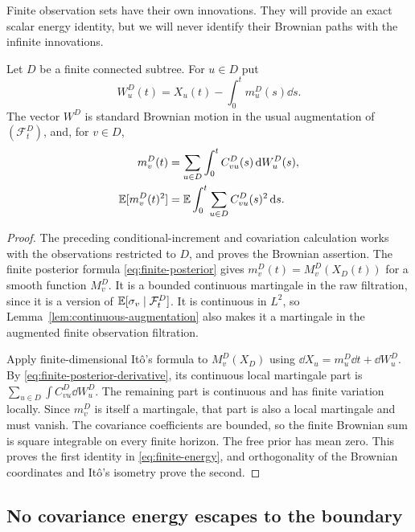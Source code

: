 Finite observation sets have their own innovations.  They will provide
an exact scalar energy identity, but we will never identify their
Brownian paths with the infinite innovations.

\begin{lemma}
 \label{lem:finite-energy}
Let $D$ be a finite connected subtree.  For $u\in D$ put
\[
 W_u^D(t)=X_u(t)-\int_0^t m_u^D(s)\dd s.
\]
The vector $W^D$ is standard Brownian motion in the usual augmentation
of $(\mathcal F_t^D)$, and, for $v\in D$,
\begin{equation}
 \label{eq:finite-energy}
 \begin{split}
 m_v^D(t)&=\sum_{u\in D}\int_0^t C_{vu}^D(s)\,\mathrm d W_u^D(s),\\
 \mathbb E[m_v^D(t)^2]
   &=\mathbb E\int_0^t\sum_{u\in D}C_{vu}^D(s)^2\,\mathrm d s .
 \end{split}
\end{equation}
\end{lemma}

\begin{proof}
The preceding conditional-increment and covariation calculation works
with the observations restricted to $D$, and proves the Brownian
assertion.  The finite posterior formula
\eqref{eq:finite-posterior} gives
$m_v^D(t)=M_v^D(X_D(t))$ for a smooth function $M_v^D$.
It is a bounded continuous martingale in the raw filtration, since it
is a version of $\mathbb E[\sigma_v\mid\mathcal F_t^D]$.  It is continuous in
$L^2$, so Lemma~\ref{lem:continuous-augmentation} also makes it a
martingale in the augmented finite observation filtration.

Apply finite-dimensional It\^o's formula to $M_v^D(X_D)$ using
$\dd X_u=m_u^D\dd t+\dd W_u^D$.  By
\eqref{eq:finite-posterior-derivative}, its continuous local martingale
part is $\sum_{u\in D}\int C_{vu}^D\dd W_u^D$.  The remaining part is
continuous and has finite variation locally.  Since $m_v^D$ is itself
a martingale, that part is also a local martingale and must vanish.
The covariance coefficients are bounded, so the finite Brownian sum
is square integrable on every finite horizon.  The free prior has mean
zero.  This proves the first identity in \eqref{eq:finite-energy}, and
orthogonality of the Brownian coordinates and It\^o's isometry prove
the second.
\end{proof}

\subsection{No covariance energy escapes to the boundary}

